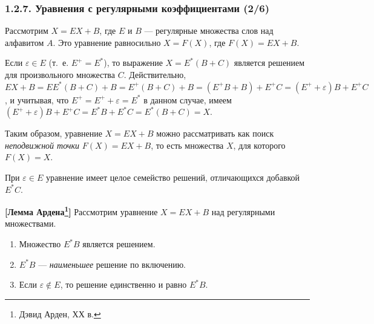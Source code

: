 \documentclass[mathserif,12pt,aspectratio=169]{beamer}
\def\NB#1{{\bf\color{brown}#1}}
\begin{document}
\begin{frame}
\frametitle{1.2.7. Уравнения с регулярными коэффициентами (2/6)}
\begin{example}
Рассмотрим $X=EX+B$, где $E$ и $B$ --- регулярные множества слов
над алфавитом $A$.
Это уравнение равносильно $X=F(X)$, где $F(X)=EX+B$.

Если $\varepsilon\in E$ (т.~е. $E^+=E^*$), то
выражение $X=E^*(B+C)$ 
является решением для произвольного множества $C$.  
Действительно, $EX +B= EE^*(B+C) +B =
E^+(B+C) +B= (E^+B+B)+E^+C =
(E^++\varepsilon)B + E^+C$,
и учитывая, что $E^+=E^++\varepsilon=E^*$  в данном случае, имеем 
$(E^++\varepsilon)B + E^+C = E^*B+E^*C=E^*(B+C)=X$.
\end{example}

\begin{remark}
Таким образом, уравнение $X=EX+B$ можно рассматривать как поиск
\emph{неподвижной точки} $F(X)=EX+B$, то есть множества $X$, для которого
$F(X)=X$.

При $\varepsilon\in E$ уравнение имеет целое семейство решений,
отличающихся добавкой $E^*C$.
\end{remark}

\begin{theorem} {\NB{[Лемма Ардена\footnote{Дэвид Арден, ХХ в.}]} }
Рассмотрим уравнение $X=EX+B$ над регулярными множествами.
\begin{enumerate}
\item Множество $E^*B$ является решением.
\item $E^*B$ --- \emph{наименьшее} решение по включению.
\item Если $\varepsilon\notin E$, то решение единственно и равно $E^*B$.
\end{enumerate}
\end{theorem}
\end{frame}
\end{document}
